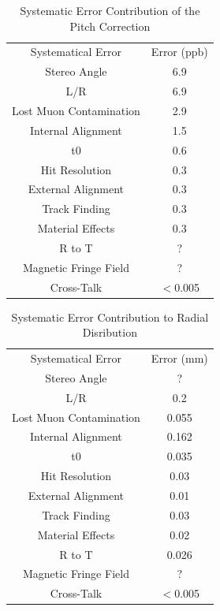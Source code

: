 \documentclass[./Thesis]{subfiles}
\begin{document}
		

\begin{table}%
\begin{center}
\caption{Systematic Error Contribution of the Pitch Correction}
\label{Tab:PitchErrors}
\begin{tabular}{ c c }
\hline
Systematical Error		&   Error (ppb)\\
Stereo Angle			&    6.9 \\
L/R					&    6.9 \\
Lost Muon Contamination &	2.9 \\
Internal Alignment		& 	1.5 \\
t$0$					&	0.6\\
Hit Resolution			&	0.3\\
External Alignment		&	0.3 \\
Track Finding			&	0.3 \\
Material Effects			&	0.3 \\
R to T				& 	? \\
Magnetic Fringe Field	&	? \\
Cross-Talk			&	$<$0.005 \\
\hline
\end{tabular}
\end{center}
\end{table}

\begin{table}%
\begin{center}
\caption{Systematic Error Contribution to Radial Disribution}
\label{Tab:RadialErrors}
\begin{tabular}{ c c }
\hline
Systematical Error		&   Error (mm)\\
Stereo Angle			&    ? \\
L/R					&    0.2\\
Lost Muon Contamination &	0.055 \\
Internal Alignment		&	0.162\\
t$0$					&	0.035 \\
Hit Resolution			&	0.03\\
External Alignment		&	0.01\\
Track Finding			&	0.03 \\
Material Effects			&	0.02\\
R to T				& 	0.026 \\
Magnetic Fringe Field	&	? \\
Cross-Talk			&	$<$0.005 \\
\hline
\end{tabular}
\end{center}
\end{table}
	
\end{document}
